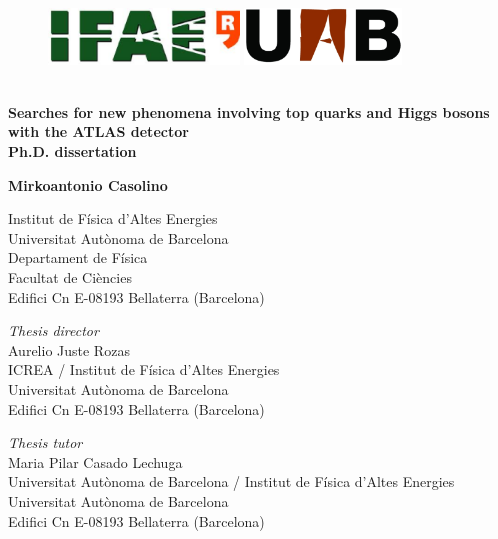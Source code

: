 \begin{titlepage}
\begin{center}

\begin{figure}[h!]
\includegraphics[height=15mm]{figures/TitlePage/IFAE_logo}
\hfill
\includegraphics[height=15mm]{figures/TitlePage/uab_logo}
\end{figure}
 
\vspace{0.5cm}
\HRule\\
\vspace{0.2cm}
{\huge \bf Searches for new phenomena involving top quarks and Higgs bosons with the ATLAS detector\\
\vspace{1cm}
Ph.D. dissertation}
\HRule\\
\par
\vspace{1.5in}
 
{\LARGE \bf Mirkoantonio Casolino}
\vspace{0.3cm}
\par
Institut de F\'{i}sica d'Altes Energies\\
Universitat Aut\`{o}noma de Barcelona\\
Departament de F\'{i}sica\\
Facultat de Ci\`{e}ncies \\
Edifici Cn E-08193 Bellaterra (Barcelona)
\par
\vspace{0.5in}
 
 
\vfill
{\it Thesis director}\\
Aurelio Juste Rozas\\
ICREA / Institut de F\'{i}sica d'Altes Energies\\
Universitat Aut\`{o}noma de Barcelona\\
Edifici Cn E-08193 Bellaterra (Barcelona)

\vfill
{\it Thesis tutor}\\
Maria Pilar Casado Lechuga\\
Universitat Aut\`{o}noma de Barcelona / Institut de F\'{i}sica d'Altes Energies\\
Universitat Aut\`{o}noma de Barcelona\\
Edifici Cn E-08193 Bellaterra (Barcelona)


\end{center}
\end{titlepage}
\sloppy

\titlepage
